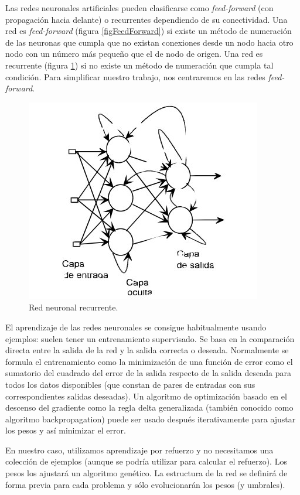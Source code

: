 \documentclass[11pt]{article}
\begin{document}
\begin{titlepage}
 Las redes neuronales artificiales pueden clasificarse como \emph{feed-forward} (con propagaci\'on hacia delante) o recurrentes dependiendo de su conectividad. Una red es \emph{feed-forward} (figura \ref{figFeedForward}) si existe un m\'etodo de numeraci\'on de las neuronas que cumpla que no existan conexiones desde un nodo hacia otro nodo con un n\'umero m\'as peque\~no que el de nodo de origen. Una red es recurrente (figura \ref{figRecurrente}) si no existe un m\'etodo de numeraci\'on que cumpla tal condici\'on. Para simplificar nuestro trabajo, nos centraremos en las redes \emph{feed-forward}.

\begin{figure}[htb]
\centering
\includegraphics[scale=0.35]{./img/recurrente.jpg}
\caption{\label{figRecurrente}Red neuronal recurrente.}
\end{figure}

 El aprendizaje de las redes neuronales se consigue habitualmente usando ejemplos: suelen tener un entrenamiento supervisado. Se basa en la comparaci\'on directa entre la salida de la red y la salida correcta o deseada. Normalmente se formula el entrenamiento como la minimizaci\'on de una funci\'on de error como el sumatorio del cuadrado del error de la salida respecto de la salida deseada para todos los datos disponibles (que constan de pares de entradas con sus correspondientes salidas deseadas). Un algoritmo de optimizaci\'on basado en el descenso del gradiente como la regla delta generalizada (tambi\'en conocido como algoritmo backpropagation) puede ser usado despu\'es iterativamente para ajustar los pesos y as\'i minimizar el error.

 En nuestro caso, utilizamos aprendizaje por refuerzo y no necesitamos una colecci\'on de ejemplos (aunque se podr\'ia utilizar para calcular el refuerzo). Los pesos los ajustar\'a un algoritmo gen\'etico. La estructura de la red se definir\'a de forma previa para cada problema y s\'olo evolucionar\'an los pesos (y umbrales).

\end{titlepage}
\end{document}
